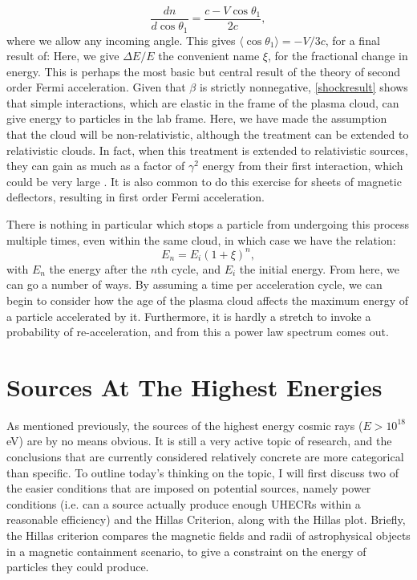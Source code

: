 $$\frac{dn}{d\cos\theta_1}=\frac{c-V\cos\theta_1}{2c},$$
where we allow any incoming angle. This gives $\langle\cos\theta_1\rangle=-V/3c$, for a final result of:
Here, we give $\Delta E/E$ the convenient name $\xi$, for the fractional change in energy. This is perhaps the most basic but central result of the theory of second order Fermi acceleration. Given that $\beta$ is strictly nonnegative, \autoref{shockresult} shows that simple interactions, which are elastic in the frame of the plasma cloud, can give energy to particles in the lab frame. Here, we have made the assumption that the cloud will be non-relativistic, although the treatment can be extended to relativistic clouds. In fact, when this treatment is extended to relativistic sources, they can gain as much as a factor of $\gamma^2$ energy from their first interaction, which could be very large \cite{shocks}. It is also common to do this exercise for sheets of magnetic deflectors, resulting in first order Fermi acceleration. 

There is nothing in particular which stops a particle from undergoing this process multiple times, even within the same cloud, in which case we have the relation:
$$E_n=E_i(1+\xi)^n,$$
with $E_n$ the energy after the $n$th cycle, and $E_i$ the initial energy. From here, we can go a number of ways. By assuming a time per acceleration cycle, we can begin to consider how the age of the plasma cloud affects the maximum energy of a particle accelerated by it. Furthermore, it is hardly a stretch to invoke a probability of re-acceleration, and from this a power law spectrum comes out.  

\section{Sources At The Highest Energies}\label{sources} %
As mentioned previously, the sources of the highest energy cosmic rays ($E>10^{18}$eV) are by no means obvious. It is still a very active topic of research, and the conclusions that are currently considered relatively concrete are more categorical than specific. To outline today's thinking on the topic, I will first discuss two of the easier conditions that are imposed on potential sources, namely power conditions (i.e. can a source actually produce enough UHECRs within a reasonable efficiency) and the Hillas Criterion, along with the Hillas plot. Briefly, the Hillas criterion compares the magnetic fields and radii of astrophysical objects in a magnetic containment scenario, to give a constraint on the energy of particles they could produce. 

